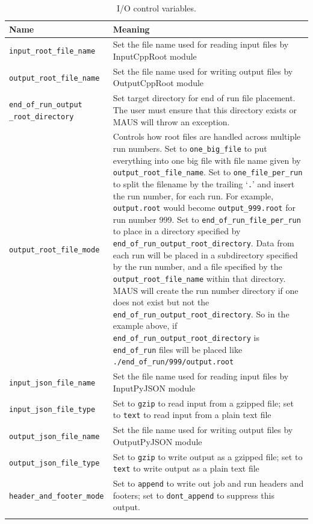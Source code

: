 \begin{table}
\begin{center}
\caption{I/O control variables.}
\begin{tabular}{p{4cm}|p{8cm}}
Name & Meaning \\
\hline
\verb|input_root_file_name| & Set the file name used for reading input files by InputCppRoot module \\
\verb|output_root_file_name| & Set the file name used for writing output files by OutputCppRoot module  \\
\verb|end_of_run_output| \verb|_root_directory| & Set target directory for end of run file placement. The user must ensure that this directory exists or MAUS will throw an exception. \\
\verb|output_root_file_mode| & Controls how root files are handled across multiple run numbers. Set to \verb|one_big_file| to put everything into one big file with file name given by \verb|output_root_file_name|. Set to \verb|one_file_per_run| to split the filename by the trailing `\verb|.|' and insert the run number, for each run. For example, \verb|output.root| would become \verb|output_999.root| for run number 999. Set to \verb|end_of_run_file_per_run| to place in a directory specified by \verb|end_of_run_output_root_directory|. Data from each run will be placed in a subdirectory specified by the run number, and a file specified by the \verb|output_root_file_name| within that directory. MAUS will create the run number directory if one does not exist but not the \verb|end_of_run_output_root_directory|. So in the example above, if \verb|end_of_run_output_root_directory| is \verb|end_of_run| files will be placed like \verb|./end_of_run/999/output.root| \\
\hline
\verb|input_json_file_name| & Set the file name used for reading input files by InputPyJSON module \\
\verb|input_json_file_type| & Set to \verb|gzip| to read input from a gzipped file; set to \verb|text| to read input from a plain text file \\
\verb|output_json_file_name| & Set the file name used for writing output files by OutputPyJSON module \\
\verb|output_json_file_type| & Set to \verb|gzip| to write output as a gzipped file; set to \verb|text| to write output as a plain text file  \\
\hline
\verb|header_and_footer_mode| & Set to \verb|append| to write out job and run headers and footers; set to \verb|dont_append| to suppress this output. \\
\begin{makeimage} %
\end{makeimage} 
\end{tabular}
\end{center}
\end{table}

